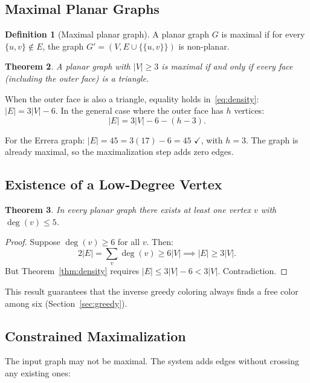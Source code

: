 \documentclass[12pt,letterpaper]{article}
\theoremstyle{plain}
\newtheorem{theorem}{Theorem}[section]
\theoremstyle{definition}
\newtheorem{definition}[theorem]{Definition}
\theoremstyle{remark}
\newcommand{\degr}{\operatorname{deg}}
\begin{document}
\subsection{Maximal Planar Graphs}

\begin{definition}[Maximal planar graph]
A planar graph $G$ is maximal if for every $\{u,v\} \notin E$, the graph
$G' = (V, E \cup \{\{u,v\}\})$ is non-planar.
\end{definition}

\begin{theorem}
A planar graph with $|V| \geq 3$ is maximal if and only if every face (including
the outer face) is a triangle.
\end{theorem}

When the outer face is also a triangle, equality holds in~\eqref{eq:density}:
$|E| = 3|V| - 6$. In the general case where the outer face has $h$ vertices:
\begin{equation}
    |E| = 3|V| - 6 - (h - 3).
    \label{eq:maximal_general}
\end{equation}

For the Errera graph: $|E| = 45 = 3(17) - 6 = 45$ $\checkmark$, with $h = 3$.
The graph is already maximal, so the maximalization step adds zero edges.

\subsection{Existence of a Low-Degree Vertex}

\begin{theorem}
\label{thm:deg5}
In every planar graph there exists at least one vertex $v$ with $\degr(v) \leq 5$.
\end{theorem}

\begin{proof}
Suppose $\degr(v) \geq 6$ for all $v$. Then:
\[
2|E| = \sum_{v} \degr(v) \geq 6|V| \implies |E| \geq 3|V|.
\]
But Theorem~\ref{thm:density} requires $|E| \leq 3|V| - 6 < 3|V|$. Contradiction.
\end{proof}

This result guarantees that the inverse greedy coloring always finds a free color
among six (Section~\ref{sec:greedy}).

\subsection{Constrained Maximalization}

The input graph may not be maximal. The system adds edges without crossing any
existing ones:
\end{document}
